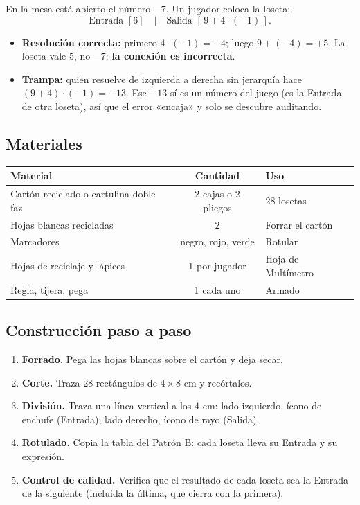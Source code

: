 \documentclass[12pt, letterpaper]{article}
\begin{document}
En la mesa está abierto el número $-7$. Un jugador coloca la loseta:
\[
\text{Entrada }[6]\quad|\quad\text{Salida }[\,9+4\cdot(-1)\,].
\]
\begin{itemize}[leftmargin=*]
  \item \textbf{Resolución correcta:} primero $4\cdot(-1)=-4$; luego $9+(-4)=+5$. La loseta vale $5$, no $-7$: \textbf{la conexión es incorrecta}.
  \item \textbf{Trampa:} quien resuelve de izquierda a derecha sin jerarquía hace $(9+4)\cdot(-1)=-13$. Ese $-13$ sí es un número del juego (es la Entrada de otra loseta), así que el error «encaja» y solo se descubre auditando.
\end{itemize}

\subsection{Materiales}

\begin{center}
\small
\begin{tabular}{@{}p{5.0cm} c p{7.4cm}@{}}
\toprule
\textbf{Material} & \textbf{Cantidad} & \textbf{Uso}\\
\midrule
Cartón reciclado o cartulina doble faz & 2 cajas o 2 pliegos & 28 losetas\\
Hojas blancas recicladas & 2 & Forrar el cartón\\
Marcadores & negro, rojo, verde & Rotular\\
Hojas de reciclaje y lápices & 1 por jugador & Hoja de Multímetro\\
Regla, tijera, pega & 1 cada uno & Armado\\
\bottomrule
\end{tabular}
\end{center}

\subsection{Construcción paso a paso}

\begin{enumerate}[leftmargin=*]
  \item \textbf{Forrado.} Pega las hojas blancas sobre el cartón y deja secar.
  \item \textbf{Corte.} Traza 28 rectángulos de $4\times 8$ cm y recórtalos.
  \item \textbf{División.} Traza una línea vertical a los $4$ cm: lado izquierdo, ícono de enchufe (Entrada); lado derecho, ícono de rayo (Salida).
  \item \textbf{Rotulado.} Copia la tabla del Patrón B: cada loseta lleva su Entrada y su expresión.
  \item \textbf{Control de calidad.} Verifica que el resultado de cada loseta sea la Entrada de la siguiente (incluida la última, que cierra con la primera).
\end{enumerate}
\end{document}
